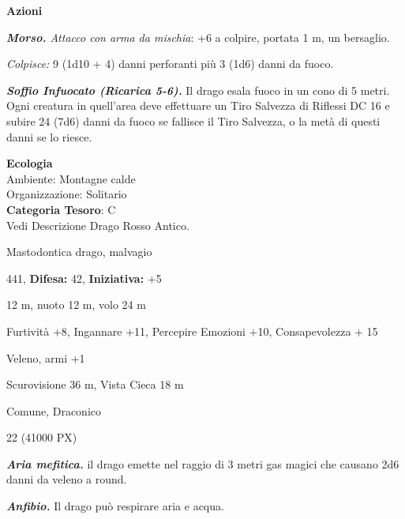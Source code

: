 \begin{multicols}{2}
{\textbf{Azioni}

\emph{\textbf{Morso.} Attacco con arma da mischia}: +6 a colpire, portata 1 m, un bersaglio.

\emph{Colpisce:} 9 (1d10 + 4) danni perforanti più 3 (1d6) danni da fuoco.

\emph{\textbf{Soffio Infuocato (Ricarica 5-6).}} Il drago esala fuoco in un cono di 5 metri. Ogni creatura in quell'area deve effettuare un Tiro Salvezza di Riflessi DC 16 e subire 24 (7d6) danni da fuoco se fallisce il Tiro Salvezza, o la metà di questi danni se lo riesce.

\textbf{Ecologia}\\
Ambiente: Montagne calde\\
Organizzazione: Solitario\\
\textbf{Categoria Tesoro}: C\\
Vedi Descrizione Drago Rosso Antico.

\noindent
\begin{description}[noitemsep, topsep=0pt, parsep=0pt, partopsep=0pt, leftmargin=0cm, labelwidth=2.2cm]
	\item[\textbf{Taglia/Tipo:}] Mastodontica drago, malvagio
	\item[\textbf{Caratt.:}] 
	\item[\textbf{Punti Ferita:}] 441,  \textbf{Difesa:} 42,  \textbf{Iniziativa:} +5
	\item[\textbf{Movimento:}] 12 m, nuoto 12 m, volo 24 m
	\item[\textbf{Tiri Salvez.:}] 
	\item[\textbf{Comp.:}] Furtività +8, Ingannare +11, Percepire Emozioni +10, Consapevolezza + 15
	\item[\textbf{Imm. Danni:}] Veleno, armi +1
	\item[\textbf{Sensi:}] Scurovisione 36 m, Vista Cieca 18 m
	\item[\textbf{Linguaggi:}] Comune, Draconico
	\item[\textbf{Sfida:}] 22 (41000 PX)\smallskip
\end{description}

\emph{\textbf{Aria mefitica.}} il drago emette nel raggio di 3 metri gas magici che causano 2d6 danni da veleno a round.

\emph{\textbf{Anfibio.}} Il drago può respirare aria e acqua.

}
\end{multicols}
